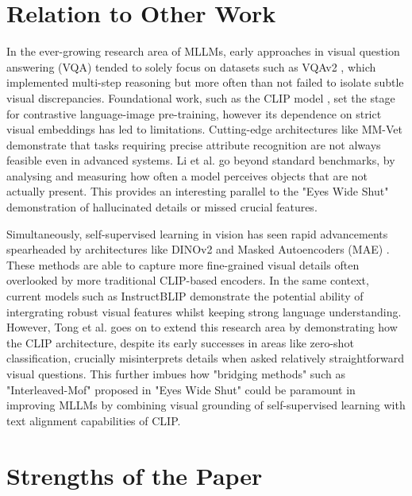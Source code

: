 \documentclass[11pt]{article}
\begin{document}
\section*{Relation to Other Work}
 
In the ever-growing research area of MLLMs, early approaches in visual question answering (VQA) tended to solely focus on datasets such as VQAv2 \cite{Goyal2017CVPR}, which implemented multi-step reasoning but more often than not failed to isolate subtle visual discrepancies.
Foundational work, such as the CLIP model \cite{Radford2021_CLIP}, set the stage for contrastive language-image pre-training, however its dependence on strict visual embeddings has led to limitations.
Cutting-edge architectures like MM-Vet \cite{Yu2023Arxiv_MMVet} demonstrate that tasks requiring precise attribute recognition are not always feasible even in advanced systems.
Li et al. \cite{Li2023Arxiv_POPE} go beyond standard benchmarks, by analysing and measuring how often a model perceives objects that are not actually present. This provides an interesting parallel to the "Eyes Wide Shut" demonstration of hallucinated details or missed crucial features.


Simultaneously, self-supervised learning in vision has seen rapid advancements spearheaded by architectures like DINOv2 and Masked Autoencoders (MAE) \cite{He2022CVPR_MAE}.
These methods are able to capture more fine-grained visual details often overlooked by more traditional CLIP-based encoders. In the same context, current models such as InstructBLIP demonstrate the potential ability of intergrating robust visual features whilst keeping strong language understanding.
However, Tong et al. \cite{Tong2024CVPR} goes on to extend this research area by demonstrating how the CLIP architecture, despite its early successes in areas like zero-shot classification, crucially misinterprets details when asked relatively straightforward visual questions.
This further imbues how "bridging methods" such as "Interleaved-Mof" proposed in "Eyes Wide Shut" could be paramount in improving MLLMs by combining visual grounding of self-supervised learning with text alignment capabilities of CLIP.

\section*{Strengths of the Paper}
\end{document}
